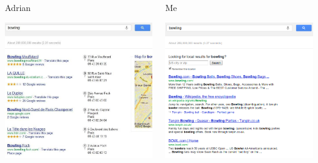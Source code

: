 \documentclass[14pt]{beamer}
\begin{document}
\begin{frame}
    \begin{columns}[T]
    \begin{column}{.5\textwidth}
     \begin{block}{Adrian}

     \hbox{}

    \includegraphics[scale=0.3]{./img/bowling.jpg}
    \end{block}
    \end{column}
    \begin{column}{.5\textwidth}
    \begin{block}{Me}

    \hbox{}

    \includegraphics[scale=0.3]{./img/bowling.png}
    \end{block}
    \end{column}
  \end{columns}
\end{frame}
\end{document}
